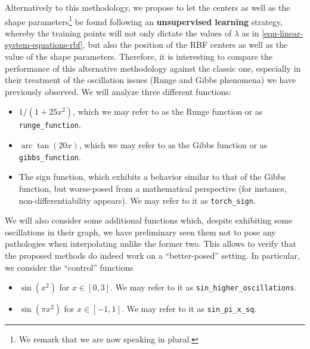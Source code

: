 \documentclass[12pt]{report} %
\newcommand{\tmop}[1]{\ensuremath{\operatorname{#1}}}
\begin{document}
Alternatively to this methodology, we propose to let the centers as well as the shape parameters\footnote{We remark that we are now speaking in plural.} be found following an \textbf{unsupervised learning} strategy, whereby the training points will not only dictate the values of $\lambda$ as in \eqref{eqn-linear-system-equations-rbf}, but also the position of the RBF centers as well as the value of the shape parameters. 
Therefore, it is interesting to compare the performance of this alternative methodology against the classic one, especially in their treatment of the oscillation
issues (Runge and Gibbs phenomena) we have previously observed. We will analyze
three different functions:
\begin{itemize}
  \item $1 / (1 + 25 x^2)$, which we may refer to as the Runge function or as \texttt{runge\_function}.
  
  \item $\tmop{arc} \tan (20 x)$, which we may refer to as the Gibbs
  function or as \texttt{gibbs\_function}.
  
  \item The sign function, which exhibits a behavior similar to that of the
  Gibbs function, but worse-posed from a mathematical perspective (for
  instance, non-differentiability appears). We may refer to it as \texttt{torch\_sign}.
\end{itemize}

We will also consider some additional functions which, despite exhibiting some
oscillations in their graph, we have preliminary seen them not to pose any
pathologies when interpolating unlike the former two. This allows to verify that
the proposed methods do indeed work on a ``better-posed'' setting. In
particular, we consider the ``control'' functions
\begin{itemize}
    \item $ \sin (x^2)$ for $x \in [0,
3]$. We may refer to it as \texttt{sin\_higher\_oscillations}.%

 \item$ \sin (\pi x^2)$ for $x \in [- 1, 1]$. We may refer to it as \texttt{sin\_pi\_x\_sq}.%
\end{itemize}
\end{document}
